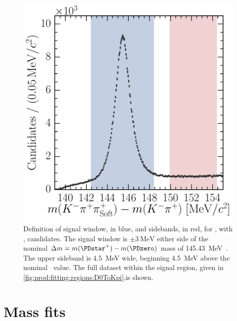 \begin{figure}
  \centering
  \includegraphics[width=\textwidth]{figures/production/fitting/DstToD0pi_D0ToKpi_delta_mass_offline_selection_regions}
  \caption{%
    Definition of signal window, in blue, and sidebands, in red, for 
    \DstToDzpi, with \DzToKpi, candidates.
    The signal window is $\pm\SI{3}{\MeV}$ either side of the nominal $\deltam 
    = m(\PDstarp) - m(\PDzero)$ mass of \SI{145.43}{\MeV}~\cite{PDG2014}.
    The upper sideband is \SI{4.5}{\MeV} wide, beginning \SI{4.5}{\MeV} above 
    the nominal \deltam\ value.
    The full dataset within the \PDzero signal region, given in 
    \cref{fig:prod:fitting:regions:D0ToKpi},is shown.
  }
  \label{fig:prod:fitting:regions:DstToD0pi_D0ToKpi}
\end{figure}

\section{Mass fits}
\label{chap:prod:fitting:mass}

